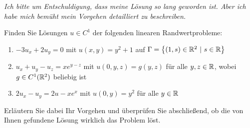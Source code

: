 \begin{exercisePage}[Charakteristikenmethode]
	
	\begin{center} \itshape
		Ich bitte um Entschuldigung, dass meine Lösung so lang geworden ist. Aber ich habe mich bemüht mein Vorgehen detailliert zu beschreiben. \smiley
	\end{center}

	\begin{task}
		Finden Sie Lösungen $u\in C^1$ der folgenden linearen Randwertprobleme:
		\begin{enumerate}
			\item $-3u_x + 2u_y = 0$ mit $u(x,y) = y^2 + 1$ auf $\Gamma = \left\{ (1,s) \in \mathbb{R}^2 ~|~ s \in \mathbb{R} \right\}$
			\item $u_x + u_y - u_z = x e^{y-z}$ mit $u(0,y,z) = g(y,z)$ für alle $y,z \in \mathbb{R}$, wobei $g \in C^1(\mathbb{R}^2)$ beliebig ist
			\item $2u_x - u_y = 2u - x e^x$ mit $u(0,y) = y^2$ für alle $y \in \mathbb{R}$
		\end{enumerate}
		Erläutern Sie dabei Ihr Vorgehen und überprüfen Sie abschließend, ob die von Ihnen gefundene Lösung wirklich das Problem löst.
	\end{task}


\end{exercisePage}
